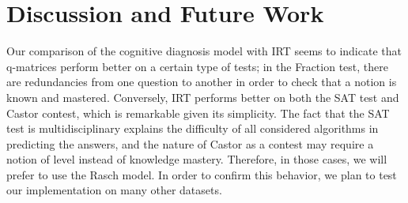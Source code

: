 \documentclass{edm_template}
\newcommand\alert[1]{\textcolor{red}{#1}}
\begin{document}

\vspace*{-2mm}

\section{Discussion and Future Work}


Our comparison of the cognitive diagnosis model with IRT seems to indicate that q-matrices perform better on a certain type of tests; in the Fraction test, there are redundancies from one question to another in order to check that a notion is known and mastered. Conversely, IRT performs better on both the SAT test and Castor contest, which is remarkable given its simplicity. The fact that the SAT test is multidisciplinary explains the difficulty of all considered algorithms in predicting the answers, and the nature of Castor as a contest may require a notion of level instead of knowledge mastery. Therefore, in those cases, we will prefer to use the Rasch model. In order to confirm this behavior, we plan to test our implementation on many other datasets.


\end{document}
